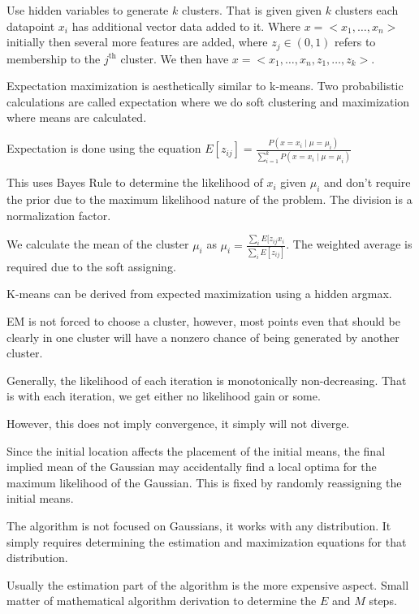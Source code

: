 \documentclass{article}
\begin{document}
Use hidden variables to generate $k$ clusters. That is given given $k$ clusters
each datapoint $x_i$ has additional vector data added to it. Where $x = <x_1, 
\ldots ,x_n>$ initially then several more features are added, where $z_j \in 
(0,1)$ refers to membership to the $j^{\text{th}}$ cluster.  We then have
$x = <x_1, \ldots, x_n, z_1, \ldots ,z_k>$.

Expectation maximization is aesthetically similar to k-means. Two probabilistic
calculations are called expectation where we do soft clustering and maximization
where means are calculated. 

Expectation is done using the equation $E[z_{ij}] = \frac{P(x = x_i \mid \mu = 
\mu_i)}{\sum_{i = 1}^k P(x = x_i  \mid \mu = \mu_i)}$

This uses Bayes Rule to determine the likelihood of $x_i$ given $\mu_i$ and 
don't require the prior due to the maximum likelihood nature of the problem. The
division is a normalization factor. 

We calculate the mean of the cluster $\mu_i$ as $\mu_i = \frac{\sum_i E[z_{ij}x_
i}{\sum_i E[z_{ij}]}$. The weighted average is required due to the soft 
assigning. 

K-means can be derived from expected maximization using a hidden argmax. 

EM is not forced to choose a cluster, however, most points even that should be
clearly in one cluster will have a nonzero chance of being generated by another
cluster. 

Generally, the likelihood of each iteration is monotonically non-decreasing. 
That is with each iteration, we get either no likelihood gain or some. 

However, this does not imply convergence, it simply will not diverge. 

Since the initial location affects the placement of the initial means, the 
final implied mean of the Gaussian may accidentally find a local optima for the 
maximum likelihood of the Gaussian. This is fixed by randomly reassigning the 
initial means.

The algorithm is not focused on Gaussians, it works with any distribution. It
simply requires determining the estimation and maximization equations for that
distribution.

Usually the estimation part of the algorithm is the more expensive aspect. 
Small matter of mathematical algorithm derivation to determine the $E$ and $M$
steps. 
\end{document}
